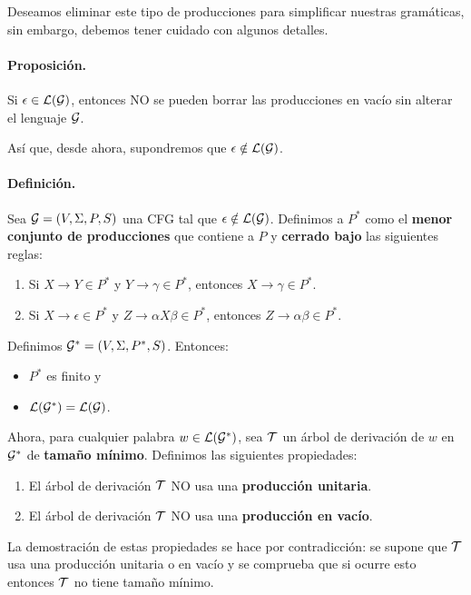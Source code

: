 Deseamos eliminar este tipo de producciones para simplificar nuestras gramáticas, sin embargo, debemos tener cuidado con algunos detalles.

\paragraph{Proposición.} Si $\epsilon \in \mathcal{L}(\mathcal{G})$, entonces NO se pueden borrar las producciones en vacío sin alterar el lenguaje $\mathcal{G}$. \medbreak

Así que, desde ahora, supondremos que $\epsilon \notin \mathcal{L}(\mathcal{G})$.

\paragraph{Definición.} Sea $\mathcal{G} = (V, \Sigma, P, S)$ una CFG tal que $\epsilon \notin \mathcal{L}(\mathcal{G})$. Definimos a $P^*$ como el \textbf{menor conjunto de producciones} que contiene a $P$ y \textbf{cerrado bajo} las siguientes reglas:
\begin{enumerate}
    \item Si $X \to Y \in P^*$ y $Y \to \gamma \in P^*$, entonces $X \to \gamma \in P^*$.
    \item Si $X \to \epsilon \in P^*$ y $Z \to \alpha X \beta \in P^*$, entonces $Z \to \alpha \beta \in P^*$.
\end{enumerate}
Definimos $\mathcal{G}^* = (V, \Sigma, P^*, S)$. Entonces:
\begin{itemize}
    \item $P^*$ es finito y
    \item $\mathcal{L}(\mathcal{G}^*) = \mathcal{L}(\mathcal{G})$.
\end{itemize}

Ahora, para cualquier palabra $w \in \mathcal{L}(\mathcal{G}^*)$, sea $\mathcal{T}$ un árbol de derivación de $w$ en $\mathcal{G}^*$ de \textbf{tamaño mínimo}. Definimos las siguientes propiedades:
\begin{enumerate}
    \item El árbol de derivación $\mathcal{T}$ NO usa una \textbf{producción unitaria}.
    \item El árbol de derivación $\mathcal{T}$ NO usa una \textbf{producción en vacío}.
\end{enumerate}

La demostración de estas propiedades se hace por contradicción: se supone que $\mathcal{T}$ usa una producción unitaria o en vacío y se comprueba que si ocurre esto entonces $\mathcal{T}$ no tiene tamaño mínimo. \bigbreak

